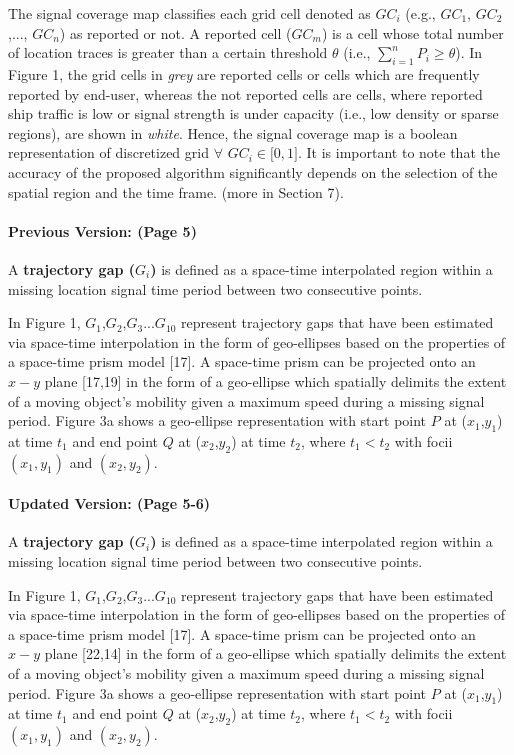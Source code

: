 \documentclass[twoside,leqno,onecolumn]{article}
\begin{document}
The signal coverage map classifies each grid cell denoted as $GC_{i}$ (e.g., $GC_{1}$, $GC_{2}$,..., $GC_{n}$) as reported or not. A reported cell ($GC_{m}$) is a cell whose total number of location traces is greater than a certain threshold $\theta$ (i.e., $\sum_{i=1}^{n} P_{i} \geq \theta$). In Figure 1, the grid cells in \textit{grey} are reported cells or cells which are frequently reported by end-user, whereas the not reported cells are cells, where reported ship traffic is low or signal strength is under capacity (i.e., low density or sparse regions), are shown in \textit{white}. Hence, the signal coverage map is a boolean representation of discretized grid $\forall$ $GC_{i} \in \lbrack0,1\rbrack$.  It is important to note that the accuracy of the proposed algorithm significantly depends on the selection of the spatial region and the time frame. (more in Section 7).\\


\paragraph{Previous Version: (Page 5)} A \textbf{trajectory gap ($G_{i}$)} is defined as a space-time interpolated region within a missing location signal time period between two consecutive points.

In Figure 1, $G_{1}$,$G_{2}$,$G_{3}$...$G_{10}$ represent trajectory gaps that have been estimated via space-time interpolation in the form of geo-ellipses based on the properties of a space-time prism model [17]. A space-time prism can be projected onto an $x-y$ plane [17,19] in the form of a geo-ellipse which spatially delimits the extent of a moving object's mobility given a maximum speed during a missing signal period. Figure 3a shows a geo-ellipse representation with start point $P$ at ($x_1$,$y_1$) at time $t_1$ and end point $Q$ at ($x_2$,$y_2$) at time $t_2$, where $t_1 < t_2$ with focii $(x_1,y_1)$ and $(x_2,y_2)$.\\


\paragraph{Updated Version: (Page 5-6)}
A \textbf{trajectory gap ($G_{i}$)} is defined as a space-time interpolated region within a missing location signal time period between two consecutive points.

In Figure 1, $G_{1}$,$G_{2}$,$G_{3}$...$G_{10}$ represent trajectory gaps that have been estimated via space-time interpolation in the form of geo-ellipses based on the properties of a space-time prism model [17]. A space-time prism can be projected onto an $x-y$ plane [22,14] in the form of a geo-ellipse which spatially delimits the extent of a moving object's mobility given a maximum speed during a missing signal period. Figure  3a shows a geo-ellipse representation with start point $P$ at ($x_1$,$y_1$) at time $t_1$ and end point $Q$ at ($x_2$,$y_2$) at time $t_2$, where $t_1 < t_2$ with focii $(x_1,y_1)$ and $(x_2,y_2)$.
\end{document}

